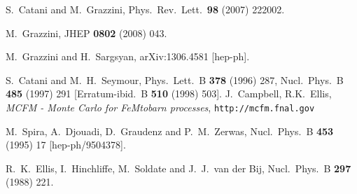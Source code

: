 \documentclass[12pt]{article}
\begin{document}
\begin{thebibliography}{99}
  S.~Catani and M.~Grazzini,
  Phys.\ Rev.\ Lett.\  {\bf 98} (2007) 222002.

  M.~Grazzini,
  JHEP {\bf 0802} (2008) 043.

  M.~Grazzini and H.~Sargsyan,
  arXiv:1306.4581 [hep-ph].

  S.~Catani and M.~H.~Seymour,
  Phys.\ Lett.\  B {\bf 378} (1996) 287,
Nucl.\ Phys.\  B {\bf 485} (1997) 291
[Erratum-ibid.\  B {\bf 510} (1998) 503].
J.~Campbell, R.K.~Ellis, {\em MCFM - Monte Carlo for FeMtobarn processes}, {\tt http://mcfm.fnal.gov}

  M.~Spira, A.~Djouadi, D.~Graudenz and P.~M.~Zerwas,
  Nucl.\ Phys.\ B {\bf 453} (1995) 17
  [hep-ph/9504378].

  R.~K.~Ellis, I.~Hinchliffe, M.~Soldate and J.~J.~van der Bij,
  Nucl.\ Phys.\ B {\bf 297} (1988) 221.


\end{thebibliography}
\end{document}
